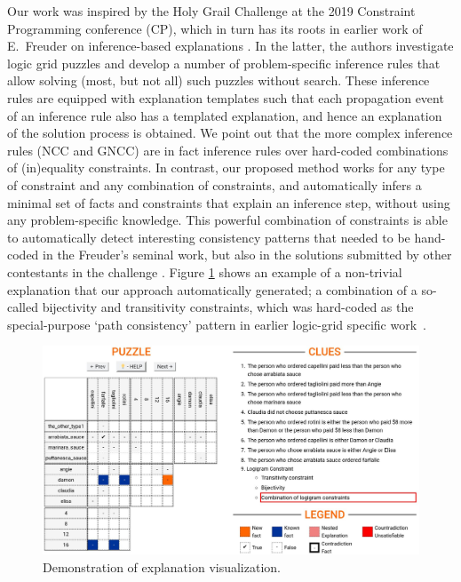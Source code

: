 Our work was inspired by the Holy Grail Challenge \cite{freuder2018progress} at the 2019 Constraint Programming conference (CP), which in turn has its roots in earlier work of E.~Freuder on inference-based explanations \cite{sqalli1996inference}.
In the latter, the authors investigate logic grid puzzles and develop a number of problem-specific inference rules that allow solving (most, but not all) such puzzles without search.
These inference rules are equipped with explanation templates such that each propagation event of an inference rule also has a templated explanation, and hence an explanation of the solution process is obtained.
We point out that the more complex inference rules (NCC and GNCC) are in fact inference rules over hard-coded combinations of (in)equality constraints.
In contrast, our proposed method works for any type of constraint and any combination of constraints, and automatically infers a minimal set of facts and constraints that explain an inference step, without using any problem-specific knowledge.
This powerful combination of constraints is able to automatically detect interesting consistency patterns that needed to be hand-coded in the Freuder's seminal work, but also in the solutions submitted by other
contestants in the challenge \cite{escamocher2019solving}.
Figure \ref{fig:zebrascreen:path} shows an example of a non-trivial explanation that our approach automatically generated; a combination of a so-called bijectivity and transitivity constraints, which was hard-coded as the special-purpose `path consistency' pattern in earlier logic-grid specific work~\cite{sqalli1996inference}.


\begin{figure}[ht]
    \centering
    \includegraphics[width=0.9\linewidth]{figures/related_work.jpeg}
    \caption{Demonstration of explanation visualization.}
    \label{fig:zebrascreen:path}
\end{figure}


